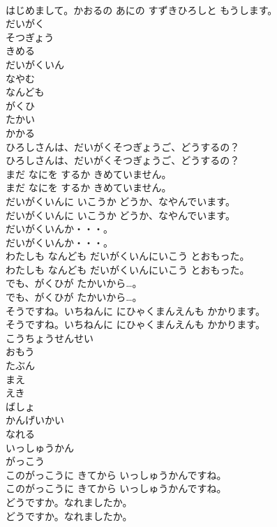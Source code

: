 \documentclass[8pt]{extreport}
\begin{document}
\begin{CJK}{UTF8}{min}
\\	はじめまして。かおるの あにの すずきひろしと もうします。 
\\	だいがく
\\	そつぎょう
\\	きめる
\\	だいがくいん
\\	なやむ
\\	なんども
\\	がくひ
\\	たかい
\\	かかる
\\	ひろしさんは、だいがくそつぎょうご、どうするの？	
\\	ひろしさんは、だいがくそつぎょうご、どうするの？ 
\\	まだ なにを するか きめていません。	
\\	まだ なにを するか きめていません。 
\\	だいがくいんに いこうか どうか、なやんでいます。	
\\	だいがくいんに いこうか どうか、なやんでいます。 
\\	だいがくいんか・・・。	
\\	だいがくいんか・・・。 
\\	わたしも なんども だいがくいんにいこう とおもった。	
\\	わたしも なんども だいがくいんにいこう とおもった。 
\\	でも、がくひが たかいから…。	
\\	でも、がくひが たかいから…。 
\\	そうですね。いちねんに にひゃくまんえんも かかります。	
\\	そうですね。いちねんに にひゃくまんえんも かかります。 
\\	こうちょうせんせい
\\	おもう
\\	たぶん
\\	まえ
\\	えき
\\	ばしょ
\\	かんげいかい
\\	なれる
\\	いっしゅうかん
\\	がっこう
\\	このがっこうに きてから いっしゅうかんですね。	
\\	このがっこうに きてから いっしゅうかんですね。 
\\	どうですか。なれましたか。	
\\	どうですか。なれましたか。 

\end{CJK}
\end{document}
